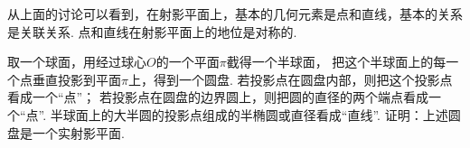 从上面的讨论可以看到，在射影平面上，基本的几何元素是点和直线，基本的关系是关联关系.
点和直线在射影平面上的地位是对称的.

\begin{example}
取一个球面，用经过球心\(O\)的一个平面\(\pi\)截得一个半球面，
把这个半球面上的每一个点垂直投影到平面\(\pi\)上，得到一个圆盘.
若投影点在圆盘内部，则把这个投影点看成一个“点”；
若投影点在圆盘的边界圆上，则把圆的直径的两个端点看成一个“点”.
半球面上的大半圆的投影点组成的半椭圆或直径看成“直线”.
证明：上述圆盘是一个实射影平面.
\end{example}
